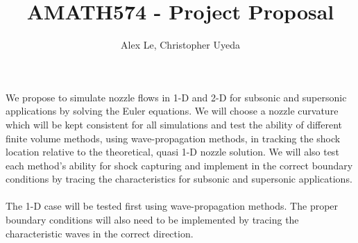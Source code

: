 \documentclass{article}%
\title{AMATH574 - Project Proposal}
\author{Alex Le, Christopher Uyeda}
\numberwithin{equation}{section}
\begin{document}
\maketitle

We propose to simulate nozzle flows in 1-D and 2-D for subsonic and supersonic applications by solving the Euler equations. We will choose a nozzle curvature which will be kept consistent for all simulations and test the ability of different finite volume methods, using wave-propagation methods, in tracking the shock location relative to the theoretical, quasi 1-D nozzle solution. We will also test each method's ability for shock capturing and implement in the correct boundary conditions by tracing the characteristics for subsonic and supersonic applications.
\\
\\
The 1-D case will be tested first using wave-propagation methods. The proper boundary conditions will also need to be implemented by tracing the characteristic waves in the correct direction.
\end{document}
